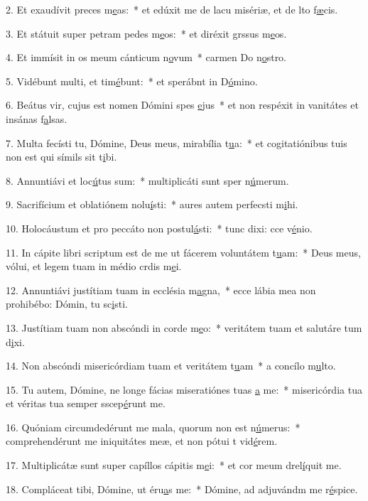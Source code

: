 2. Et exaudívit preces m\uline{e}as:~* et edúxit me de lacu misériæ, et de lto f\uline{æ}cis.\par 
3. Et státuit super petram pedes m\uline{e}os:~* et diréxit grssus m\uline{e}os.\par 
4. Et immísit in os meum cánticum n\uline{o}vum~* carmen Do n\uline{o}stro.\par 
5. Vidébunt multi, et tim\uline{é}bunt:~* et sperábnt in D\uline{ó}mino.\par 
6. Beátus vir, cujus est nomen Dómini spes \uline{e}jus~* et non respéxit in vanitátes et insánas f\uline{a}lsas.\par 
7. Multa fecísti tu, Dómine, Deus meus, mirabília t\uline{u}a:~* et cogitatiónibus tuis non est qui símils sit t\uline{i}bi.\par 
8. Annuntiávi et loc\uline{ú}tus sum:~* multiplicáti sunt sper n\uline{ú}merum.\par 
9. Sacrifícium et oblatiónem nolu\uline{í}sti:~* aures autem perfecsti m\uline{i}hi.\par 
10. Holocáustum et pro peccáto non postul\uline{á}sti:~* tunc dixi: cce v\uline{é}nio.\par 
11. In cápite libri scriptum est de me ut fácerem voluntátem t\uline{u}am:~* Deus meus, vólui, et legem tuam in médio crdis m\uline{e}i.\par 
12. Annuntiávi justítiam tuam in ecclésia m\uline{a}gna,~* ecce lábia mea non prohibébo: Dómin, tu sc\uline{i}sti.\par 
13. Justítiam tuam non abscóndi in corde m\uline{e}o:~* veritátem tuam et salutáre tum d\uline{i}xi.\par 
14. Non abscóndi misericórdiam tuam et veritátem t\uline{u}am~* a concílo m\uline{u}lto.\par 
15. Tu autem, Dómine, ne longe fácias miseratiónes tuas \uline{a} me:~* misericórdia tua et véritas tua semper sscep\uline{é}runt me.\par 
16. Quóniam circumdedérunt me mala, quorum non est n\uline{ú}merus:~* comprehendérunt me iniquitátes meæ, et non pótui t vid\uline{é}rem.\par 
17. Multiplicátæ sunt super capíllos cápitis m\uline{e}i:~* et cor meum drel\uline{í}quit me.\par 
18. Compláceat tibi, Dómine, ut éru\uline{a}s me:~* Dómine, ad adjuvándm me r\uline{é}spice.\par 
